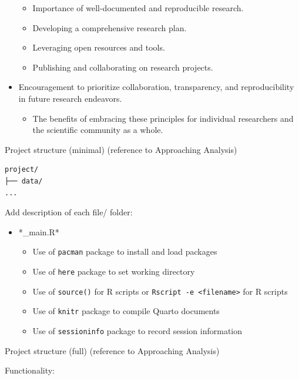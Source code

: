 \documentclass[
  letterpaper,
  DIV=11,
  numbers=noendperiod]{scrreprt}
\providecommand{\tightlist}{%
  \setlength{\itemsep}{0pt}\setlength{\parskip}{0pt}}\usepackage{longtable,booktabs,array}
\theoremstyle{definition}
\theoremstyle{remark}
\begin{document}
\begin{itemize}
  \begin{itemize}
  \tightlist
  \item
    Importance of well-documented and reproducible research.
  \item
    Developing a comprehensive research plan.
  \item
    Leveraging open resources and tools.
  \item
    Publishing and collaborating on research projects.
  \end{itemize}
\item
  Encouragement to prioritize collaboration, transparency, and
  reproducibility in future research endeavors.

  \begin{itemize}
  \tightlist
  \item
    The benefits of embracing these principles for individual
    researchers and the scientific community as a whole.
  \end{itemize}
\end{itemize}

Project structure (minimal) (reference to Approaching Analysis)

\begin{verbatim}
project/
├── data/
...
\end{verbatim}

Add description of each file/ folder:

\begin{itemize}
\tightlist
\item
  *\_main.R*

  \begin{itemize}
  \tightlist
  \item
    Use of \texttt{pacman} package to install and load packages
  \item
    Use of \texttt{here} package to set working directory
  \item
    Use of \texttt{source()} for R scripts or
    \texttt{Rscript\ -e\ \textless{}filename\textgreater{}} for R
    scripts
  \item
    Use of \texttt{knitr} package to compile Quarto documents
  \item
    Use of \texttt{sessioninfo} package to record session information
  \end{itemize}
\end{itemize}

Project structure (full) (reference to Approaching Analysis)

Functionality:
\end{document}
